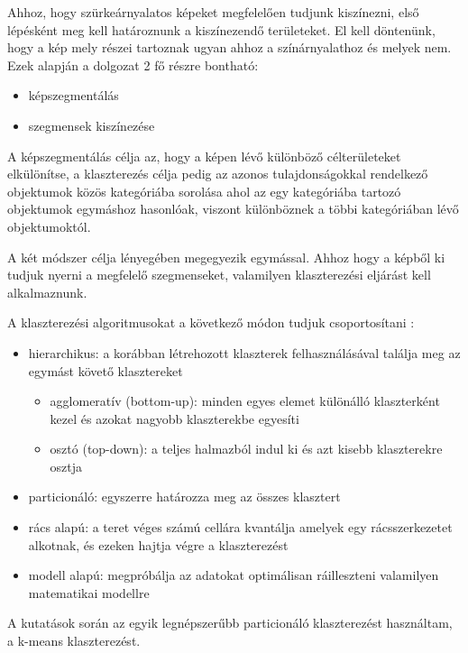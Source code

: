 

Ahhoz, hogy szürkeárnyalatos képeket megfelelően tudjunk kiszínezni, első lépésként meg kell határoznunk a kiszínezendő területeket. El kell döntenünk, hogy a kép mely részei tartoznak ugyan ahhoz a színárnyalathoz és melyek nem. Ezek alapján a dolgozat 2 fő részre bontható:
\begin{itemize}
\item képszegmentálás
\item szegmensek kiszínezése
\end{itemize}

A képszegmentálás célja az, hogy a képen lévő különböző célterületeket elkülönítse, a klaszterezés célja pedig az azonos tulajdonságokkal rendelkező objektumok közös kategóriába sorolása ahol az egy kategóriába tartozó objektumok egymáshoz hasonlóak, viszont különböznek a többi kategóriában lévő objektumoktól.

A két módszer célja lényegében megegyezik egymással. Ahhoz hogy a képből ki tudjuk nyerni a megfelelő szegmenseket, valamilyen klaszterezési eljárást kell alkalmaznunk.

A klaszterezési algoritmusokat a következő módon tudjuk csoportosítani \cite{clustering}:
\begin{itemize}
\item hierarchikus: a korábban létrehozott klaszterek felhasználásával találja meg az egymást követő klasztereket
    \begin{itemize}
    \item agglomeratív (bottom-up): minden egyes elemet különálló klaszterként kezel és azokat nagyobb klaszterekbe egyesíti
    \item osztó (top-down): a teljes halmazból indul ki és azt kisebb klaszterekre osztja
    \end{itemize}
\item particionáló: egyszerre határozza meg az összes klasztert
\item rács alapú: a teret véges számú cellára kvantálja amelyek egy rácsszerkezetet alkotnak, és ezeken hajtja végre a klaszterezést
\item modell alapú: megpróbálja az adatokat optimálisan ráilleszteni valamilyen matematikai modellre
\end{itemize}

A kutatások során az egyik legnépszerűbb particionáló klaszterezést használtam, a k-means klaszterezést.

